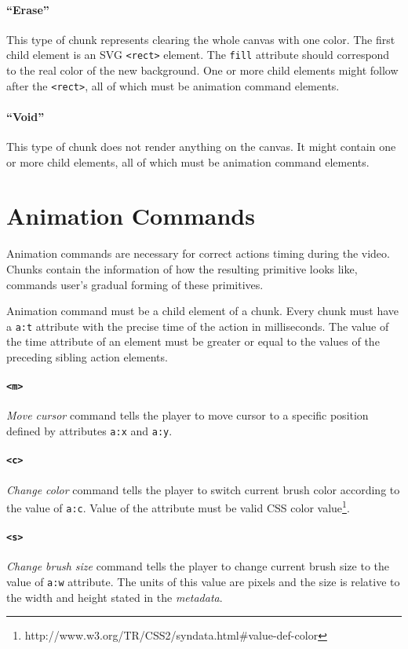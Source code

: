 \paragraph{``Erase''}
This type of chunk represents clearing the whole canvas with one color. The first child element is an SVG \verb|<rect>| element. The \verb|fill| attribute should correspond to the real color of the new background. One or more child elements might follow after the \verb|<rect>|, all of which must be animation command elements.

\paragraph{``Void''}
This type of chunk does not render anything on the canvas. It might contain one or more child elements, all of which must be animation command elements.

\section{Animation Commands}
Animation commands are necessary for correct actions timing during the video. Chunks contain the information of how the resulting primitive looks like, commands user's gradual forming of these primitives.

Animation command must be a child element of a chunk. Every chunk must have a \verb|a:t| attribute with the precise time of the action in milliseconds. The value of the time attribute of an element must be greater or equal to the values of the preceding sibling action elements.

\paragraph{\texttt{\textless m\textgreater}}
\textit{Move cursor} command tells the player to move cursor to a specific position defined by attributes \verb|a:x| and \verb|a:y|.

\paragraph{\texttt{\textless c\textgreater}}
\textit{Change color} command tells the player to switch current brush color according to the value of \verb|a:c|. Value of the attribute must be valid CSS color value\footnote{http://www.w3.org/TR/CSS2/syndata.html\#value-def-color}.

\paragraph{\texttt{\textless s\textgreater}}
\textit{Change brush size} command tells the player to change current brush size to the value of \verb|a:w| attribute. The units of this value are pixels and the size is relative to the width and height stated in the \textit{metadata}.

